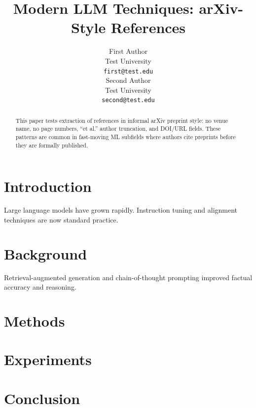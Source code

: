 \documentclass[11pt]{article}
\title{Modern LLM Techniques: arXiv-Style References}
\author{First Author \\
  Test University \\
  \texttt{first@test.edu} \\\And
  Second Author \\
  Test University \\
  \texttt{second@test.edu} \\}
\begin{document}
\maketitle

\begin{abstract}
This paper tests extraction of references in informal arXiv preprint style:
no venue name, no page numbers, ``et al.'' author truncation, and DOI/URL fields.
These patterns are common in fast-moving ML subfields where authors cite
preprints before they are formally published.
\end{abstract}

\section{Introduction}
\lipsum[1-2]
Large language models \cite{touvron2023llama,jiang2023mistral,bai2023qwen}
have grown rapidly. Instruction tuning \cite{ouyang2022instructgpt} and
alignment techniques \cite{bai2022constitutional} are now standard practice.

\lipsum[3-4]

\section{Background}
\lipsum[5-6]
Retrieval-augmented generation \cite{lewis2020rag} and chain-of-thought
prompting \cite{wei2022cot} improved factual accuracy and reasoning.

\lipsum[7-8]

\section{Methods}
\lipsum[9-11]

\section{Experiments}
\lipsum[12-14]

\section{Conclusion}
\lipsum[15]



\end{document}

